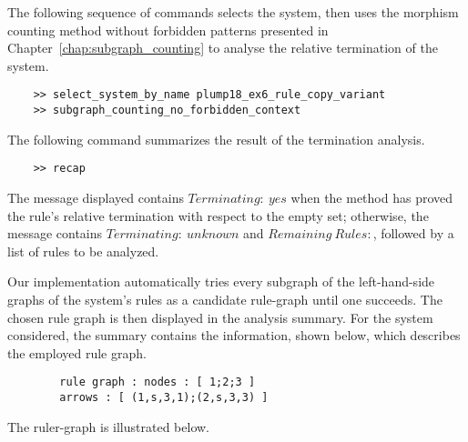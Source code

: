 The following sequence of commands selects the system, then uses the morphism counting method without forbidden patterns presented in Chapter~\ref{chap:subgraph_counting} to analyse the relative termination of the system.
\begin{verbatim}
    >> select_system_by_name plump18_ex6_rule_copy_variant
    >> subgraph_counting_no_forbidden_context
\end{verbatim}
The following command summarizes the result of the termination analysis.
 \begin{verbatim}
    >> recap
\end{verbatim}

The message displayed contains \colorbox{Ivory2}{$Terminating:\ yes$} when the method has proved the rule's relative termination with respect to the empty set; otherwise, the message contains \colorbox{Ivory2}{$Terminating:\ unknown$} and \colorbox{Ivory2}{$Remaining\ Rules:$}, followed by a list of rules to be analyzed.

Our implementation automatically tries every subgraph of the left-hand-side graphs of the system's rules as a candidate rule-graph until one succeeds. The chosen rule graph is then displayed in the analysis summary. For the system considered, the summary contains the information, shown below, which describes the employed rule graph.
\begin{center}
    \begin{verbatim}
        rule graph : nodes : [ 1;2;3 ]
        arrows : [ (1,s,3,1);(2,s,3,3) ]
    \end{verbatim}
\end{center}
The ruler-graph is illustrated below.
\begin{center}
    \end{center}

